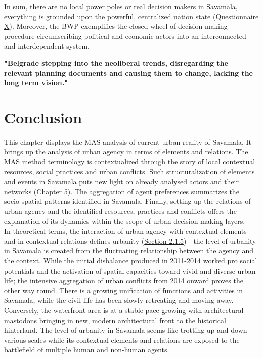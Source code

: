 \documentclass[11pt]{report}
\begin{document}
In sum, there are no local power poles or real decision makers in Savamala, everything is grounded upon the powerful, centralized nation state
(\href{Questionnaire Experts Savamala}{Questionnaire X}).
Moreover, the BWP exemplifies the closed wheel of decision-making procedure circumscribing political and economic actors into an interconnected and interdependent system.

\textbf{"Belgrade stepping into the neoliberal trends, disregarding the relevant planning documents and causing them to change, lacking the long term vision."} \citealt{doytchinov_belgrade:_2015}

\section{Conclusion}

This chapter displays the MAS analysis of current urban reality of Savamala.
It brings up the analysis of urban agency in terms of elements and relations.
The MAS method terminology is contextualized through the story of local contextual resources, social practices and urban conflicts.
Such structuralization of elements and events in Savamala puts new light on already analysed actors and their networks (\href{Chapter 5}{Chapter 5}). The aggregation of agent preferences summarizes the socio-spatial patterns identified in Savamala. Finally, setting up the relations of urban agency and the identified resources, practices and conflicts offers the explanation of its dynamics within the scope of urban decision-making layers.
\\

In theoretical terms, the interaction of urban agency with contextual elements and in contextual relations defines urbanity (\href{Section 2.1.5}{Section 2.1.5}) - the level of urbanity in Savamala is created from the fluctuating relationship between the agency and the context.
While the initial disbalance produced in 2011-2014 worked pro social potentials and the activation of spatial capacities toward vivid and diverse urban life; the intensive aggregation of urban conflicts from 2014 onward proves the other way round.
There is a growing unification of functions and activities in Savamala, while the civil life has been slowly retreating and moving away.
Conversely, the waterfront area is at a stable pace growing with architectural mastodons bringing in new, modern architectural front to the historical hinterland.
The level of urbanity in Savamala seems like trotting up and down various scales while its contextual elements and relations are exposed to the battlefield of multiple human and non-human agents.
\\
\end{document}
